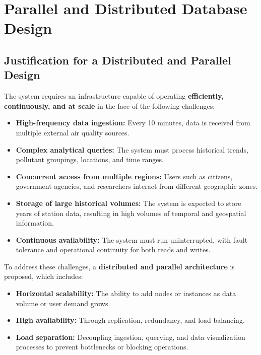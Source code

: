 
\section{Parallel and Distributed Database Design}

\subsection{Justification for a Distributed and Parallel Design}

The system requires an infrastructure capable of operating \textbf{efficiently, continuously, and at scale} in the face of the following challenges:

\begin{itemize}[leftmargin=1.5em]
  \item \textbf{High-frequency data ingestion:} Every 10 minutes, data is received from multiple external air quality sources.
  \item \textbf{Complex analytical queries:} The system must process historical trends, pollutant groupings, locations, and time ranges.
  \item \textbf{Concurrent access from multiple regions:} Users such as citizens, government agencies, and researchers interact from different geographic zones.
  \item \textbf{Storage of large historical volumes:} The system is expected to store years of station data, resulting in high volumes of temporal and geospatial information.
  \item \textbf{Continuous availability:} The system must run uninterrupted, with fault tolerance and operational continuity for both reads and writes.
\end{itemize}

To address these challenges, a \textbf{distributed and parallel architecture} is proposed, which includes:

\begin{itemize}[leftmargin=1.5em]
  \item \textbf{Horizontal scalability:} The ability to add nodes or instances as data volume or user demand grows.
  \item \textbf{High availability:} Through replication, redundancy, and load balancing.
  \item \textbf{Load separation:} Decoupling ingestion, querying, and data visualization processes to prevent bottlenecks or blocking operations.
\end{itemize}

